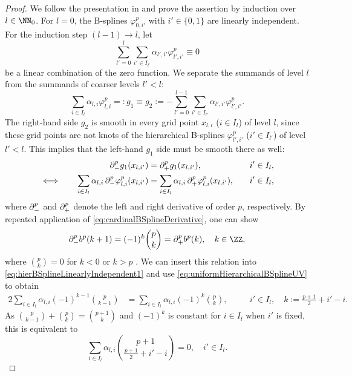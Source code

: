 \begin{proof}
  We follow the presentation in \cite{Valentin16Hierarchical} and
  prove the assertion by induction over $l \in \NN_0$.
  For $l = 0$, the B-splines $\varphi_{0,i'}^p$ with $i' \in \{0, 1\}$
  are linearly independent.
  For the induction step $(l-1) \to l$, let
  \begin{equation}
    \sum_{l'=0}^l \sum_{i' \in I_{l'}} \alpha_{l',i'} \varphi_{l',i'}^p
    \equiv 0
  \end{equation}
  be a linear combination of the zero function.
  We separate the summands of level $l$
  from the summands of coarser levels $l' < l$:
  \begin{equation}
    \label{eq:hierBSplineLinearlyIndependent3}
    \sum_{i \in I_l} \alpha_{l,i} \varphi_{l,i}^p
    =: g_1 \equiv g_2 :=
    -\sum_{l'=0}^{l-1} \sum_{i' \in I_{l'}} \alpha_{l',i'} \varphi_{l',i'}^p.
  \end{equation}
  The right-hand side $g_2$ is smooth in every grid point
  $x_{l,i}$ ($i \in I_l$) of level $l$,
  since these grid points are not knots of the hierarchical B-splines
  $\varphi_{l',i'}^p$ ($i' \in I_{l'}$) of level $l' < l$.
  This implies that the left-hand $g_1$ side must be smooth there as well:
  \begin{alignat}{3}
    &&
    \mathop{}\!\partial_-^p g_1(x_{l,i'})
    &= \mathop{}\!\partial_+^p g_1(x_{l,i'}),\quad
    &&i' \in I_l,\\
    \label{eq:hierBSplineLinearlyIndependent1}
    \iff\quad&&
    \sum_{i \in I_l} \alpha_{l,i}
    \mathop{}\!\partial_-^p \varphi_{l,i}^p(x_{l,i'})
    &= \sum_{i \in I_l} \alpha_{l,i}
    \mathop{}\!\partial_+^p \varphi_{l,i}^p(x_{l,i'}),\quad
    &&i' \in I_l,
  \end{alignat}
  where $\mathop{}\!\partial_-^p$ and $\mathop{}\!\partial_+^p$ denote the left and right
  derivative of order $p$, respectively.
  By repeated application of \eqref{eq:cardinalBSplineDerivative},
  one can show
  \begin{equation}
    \partialdiff_-^p b^p(k + 1)
    = (-1)^k \binom{p}{k}
    = \partialdiff_+^p b^p(k),\quad
    k \in \ZZ,
  \end{equation}
  where $\binom{p}{k} = 0$ for $k < 0$ or $k > p$
  \cite{Hoellig13Approximation}.
  We can insert this relation into
  \eqref{eq:hierBSplineLinearlyIndependent1}
  and use \eqref{eq:uniformHierarchicalBSplineUV} to obtain
  \begin{alignat}{2}
    \sum_{i \in I_l} \alpha_{l,i} (-1)^{k-1} \binom{p}{k-1}
    &= \sum_{i \in I_l} \alpha_{l,i} (-1)^k \binom{p}{k},\quad
    &&i' \in I_l,\quad
    k := \frac{p+1}{2} + i' - i.
  \end{alignat}
  As $\binom{p}{k-1} + \binom{p}{k} = \binom{p+1}{k}$
  and $(-1)^k$ is constant for $i \in I_l$ when $i'$ is fixed,
  this is equivalent to
  \begin{equation}
    \label{eq:hierBSplineLinearlyIndependent2}
    \sum_{i \in I_l} \alpha_{l,i}
    \binom{p+1}{\frac{p+1}{2} + i' - i} = 0,\quad
    i' \in I_l.
  \end{equation}
  

\end{proof}
